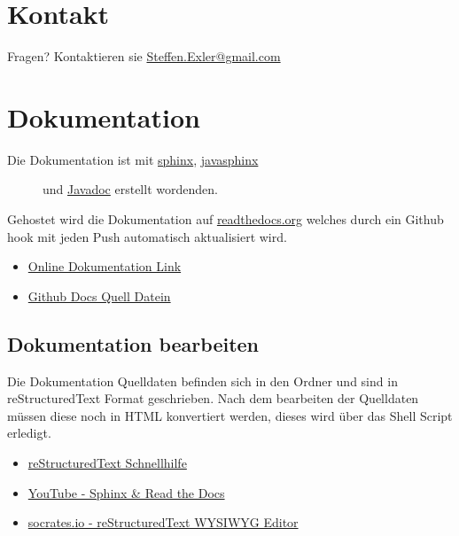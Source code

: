 \documentclass[letterpaper,10pt,ngerman]{sphinxmanual}
\begin{document}
\section{Kontakt}
\label{license:kontakt}
Fragen? Kontaktieren sie \href{mailto:Steffen.Exler@gmail.com}{Steffen.Exler@gmail.com}


\section{Dokumentation}
\label{docs:dokumentation}\label{docs::doc}
\begin{description}
\item[{Die Dokumentation ist mit \href{http://www.sphinx-doc.org/en/1.4.8/}{sphinx}, \href{https://bronto.github.io/javasphinx/}{javasphinx}}] \leavevmode
und \href{https://en.wikipedia.org/wiki/Javadoc}{Javadoc}  erstellt wordenden.

\end{description}

Gehostet wird die Dokumentation auf \href{https://readthedocs.org/}{readthedocs.org} welches durch ein Github hook mit jeden Push automatisch aktualisiert wird.
\begin{itemize}
\item {} 
\href{https://readthedocs.org/projects/polynomials-calculator/}{Online Dokumentation Link}

\item {} 
\href{https://github.com/linuxluigi/polynomials-calculator/tree/master/docs}{Github Docs Quell Datein}

\end{itemize}


\subsection{Dokumentation bearbeiten}
\label{docs:dokumentation-bearbeiten}
Die Dokumentation Quelldaten befinden sich in den Ordner  und sind in reStructuredText Format geschrieben.
Nach dem bearbeiten der Quelldaten müssen diese noch in HTML konvertiert werden, dieses wird über das Shell Script
 erledigt.
\begin{itemize}
\item {} 
\href{http://docutils.sourceforge.net/docs/user/rst/quickref.html}{reStructuredText Schnellhilfe}

\item {} 
\href{https://www.youtube.com/watch?v=oJsUvBQyHBs}{YouTube - Sphinx \& Read the Docs}

\item {} 
\href{http://socrates.io/}{socrates.io - reStructuredText WYSIWYG Editor}

\end{itemize}
\end{document}
